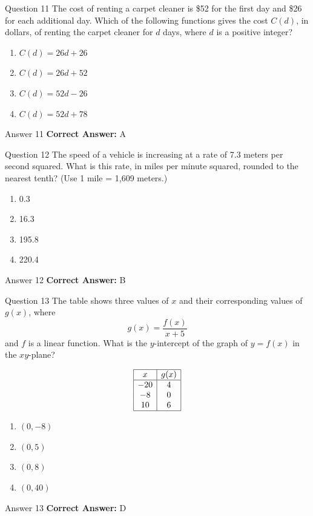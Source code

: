 \documentclass{beamer}
\begin{document}
\begin{frame}{Question 11}
\small
The cost of renting a carpet cleaner is \$52 for the first day and \$26 for each additional day.
Which of the following functions gives the cost \(C(d)\), in dollars, of renting the carpet cleaner for \(d\) days, where \(d\) is a positive integer?
\vspace{0.35cm}
\begin{enumerate}
    \item[A.] \(C(d) = 26d + 26\)
    \item[B.] \(C(d) = 26d + 52\)
    \item[C.] \(C(d) = 52d - 26\)
    \item[D.] \(C(d) = 52d + 78\)
\end{enumerate}
\end{frame}
\begin{frame}{Answer 11}
\small
\textbf{Correct Answer:} A
\end{frame}

\begin{frame}{Question 12}
\small
The speed of a vehicle is increasing at a rate of 7.3 meters per second squared.
What is this rate, in miles per minute squared, rounded to the nearest tenth?
(Use 1 mile = 1,609 meters.)
\vspace{0.35cm}
\begin{enumerate}
    \item[A.] 0.3
    \item[B.] 16.3
    \item[C.] 195.8
    \item[D.] 220.4
\end{enumerate}
\end{frame}
\begin{frame}{Answer 12}
\small
\textbf{Correct Answer:} B
\end{frame}

\begin{frame}{Question 13}
\small
The table shows three values of \(x\) and their corresponding values of \(g(x)\), where
\[
g(x) = \frac{f(x)}{x + 5}
\]
and \(f\) is a linear function.
What is the \(y\)-intercept of the graph of \(y = f(x)\) in the \(xy\)-plane?

\[
\begin{array}{|c|c|}
\hline
x & g(x) \\
\hline
-20 & 4 \\
-8 & 0 \\
10 & 6 \\
\hline
\end{array}
\]
\vspace{0.35cm}
\begin{enumerate}
    \item[A.] \((0, -8)\)
    \item[B.] \((0, 5)\)
    \item[C.] \((0, 8)\)
    \item[D.] \((0, 40)\)
\end{enumerate}
\end{frame}
\begin{frame}{Answer 13}
\small
\textbf{Correct Answer:} D
\end{frame}
\end{document}
